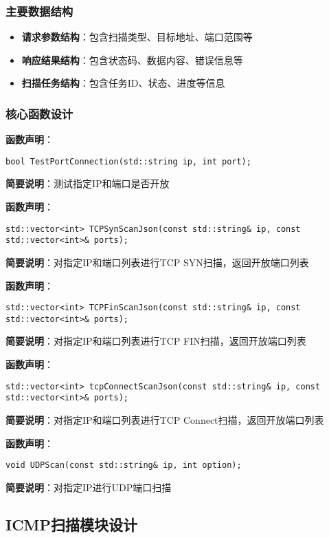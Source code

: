 \documentclass[12pt,hyperref,a4paper,UTF8]{ctexart}
\begin{document}
\subsubsection{主要数据结构}
\begin{itemize}
    \item \textbf{请求参数结构}：包含扫描类型、目标地址、端口范围等
    \item \textbf{响应结果结构}：包含状态码、数据内容、错误信息等
    \item \textbf{扫描任务结构}：包含任务ID、状态、进度等信息
\end{itemize}

\subsubsection{核心函数设计}

\textbf{函数声明}：
\begin{verbatim}
bool TestPortConnection(std::string ip, int port);
\end{verbatim}
\textbf{简要说明}：测试指定IP和端口是否开放

\textbf{函数声明}：
\begin{verbatim}
std::vector<int> TCPSynScanJson(const std::string& ip, const std::vector<int>& ports);
\end{verbatim}
\textbf{简要说明}：对指定IP和端口列表进行TCP SYN扫描，返回开放端口列表

\textbf{函数声明}：
\begin{verbatim}
std::vector<int> TCPFinScanJson(const std::string& ip, const std::vector<int>& ports);
\end{verbatim}
\textbf{简要说明}：对指定IP和端口列表进行TCP FIN扫描，返回开放端口列表

\textbf{函数声明}：
\begin{verbatim}
std::vector<int> tcpConnectScanJson(const std::string& ip, const std::vector<int>& ports);
\end{verbatim}
\textbf{简要说明}：对指定IP和端口列表进行TCP Connect扫描，返回开放端口列表

\textbf{函数声明}：
\begin{verbatim}
void UDPScan(const std::string& ip, int option);
\end{verbatim}
\textbf{简要说明}：对指定IP进行UDP端口扫描

\subsection{ICMP扫描模块设计}
\end{document}
